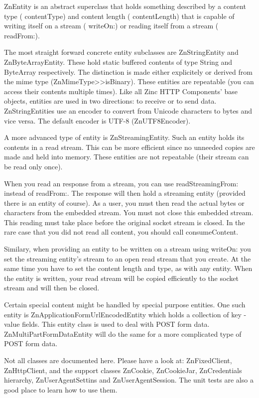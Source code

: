 \documentclass[a4paper,10pt,twoside]{book}
\begin{document}
ZnEntity is an abstract superclass that holds something described by a content type ( contentType) and content length ( contentLength) that is capable of writing itself on a stream ( writeOn:) or reading itself from a stream ( readFrom:).

The most straight forward concrete entity subclasses are ZnStringEntity and ZnByteArrayEntity. These hold static buffered contents of type String and ByteArray respectively. The distinction is made either explicitely or derived from the mime type (ZnMimeType>>isBinary). These entities are repeatable (you can access their contents multiple times). Like all Zinc HTTP Components' base objects, entities are used in two directions: to receive or to send data. ZnStringEntities use an encoder to convert from Unicode characters to bytes and vice versa. The default encoder is UTF-8 (ZnUTF8Encoder).

A more advanced type of entity is ZnStreamingEntity. Such an entity holds its contents in a read stream. This can be more efficient since no unneeded copies are made and held into memory. These entities are not repeatable (their stream can be read only once).

When you read an response from a stream, you can use  readStreamingFrom: instead of  readFrom:. The response will then hold a streaming entity (provided there is an entity of course). As a user, you must then read the actual bytes or characters from the embedded stream. You must not close this embedded stream. This reading must take place before the original socket stream is closed. In the rare case that you did not read all content, you should call  consumeContent.

Similary, when providing an entity to be written on a stream using  writeOn: you set the streaming entity's stream to an open read stream that you create. At the same time you have to set the content length and type, as with any entity. When the entity is written, your read stream will be copied efficiently to the socket stream and will then be closed.

Certain special content might be handled by special purpose entities. One such entity is ZnApplicationFormUrlEncodedEntity which holds a collection of key - value fields. This entity class is used to deal with POST form data. ZnMultiPartFormDataEntity will do the same for a more complicated type of POST form data.

Not all classes are documented here. Please have a look at: ZnFixedClient, ZnHttpClient, and the support classes ZnCookie, ZnCookieJar, ZnCredentials hierarchy, ZnUserAgentSettins and ZnUserAgentSession. The unit tests are also a good place to learn how to use them.
\end{document}
